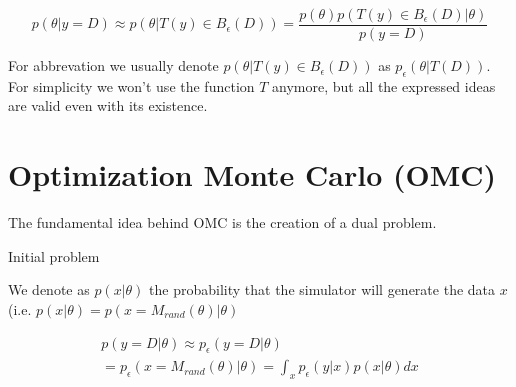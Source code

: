 \documentclass{article}
\begin{document}
\begin{equation} \label{eq:summary_stat}
    p(\theta|y=D) \approx p(\theta|T(y) \in B_\epsilon(D)) = \frac{p(\theta) p(T(y) \in B_\epsilon(D)|\theta)}{p(y=D)}
\end{equation}

For abbrevation we usually denote $p(\theta|T(y) \in B_\epsilon(D))$ as $p_\epsilon(\theta|T(D))$. For simplicity we won't use the function $T$ anymore, but all the expressed ideas are valid even with its existence.

\section{Optimization Monte Carlo (OMC)}

The fundamental idea behind OMC is the creation of a dual problem.

Initial problem

We denote as $p(x|\theta)$ the probability that the simulator will generate the data $x$ (i.e. $p(x|\theta) = p(x=M_{rand}(\theta)|\theta)$

\begin{gather*}
    p(y=D|\theta) \approx p_\epsilon(y = D|\theta) \\
    = p_\epsilon (x= M_{rand}(\theta)|\theta) = \int_x p_\epsilon(y|x)p(x|\theta)dx
\end{gather*}
    
\end{document}
